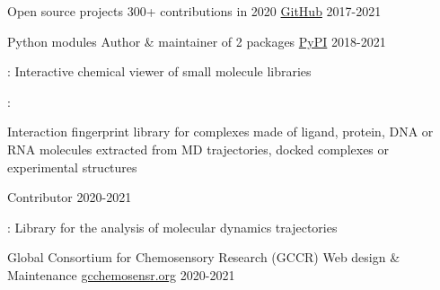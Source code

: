 
\begin{cventries}

  \cventry
    {Open source projects}
    {300+ contributions in 2020}
    {\href{https://github.com/cbouy/}{GitHub}}
    {2017-2021}
    {}

  \cventry
    {Python modules}
    {Author \& maintainer of 2 packages}
    {\href{https://pypi.org/user/cbouy/}{PyPI}}
    {2018-2021}
    {
      \begin{cvitems}
        \item{: Interactive chemical viewer of small molecule libraries}
        \item{: \parbox[t]{.7\textwidth}{Interaction fingerprint library for complexes made of ligand, protein, DNA or RNA molecules extracted from MD trajectories, docked complexes or experimental structures}}
      \end{cvitems}
    }
  
  \vspace{.3em}
  \cventry
    {}
    {Contributor}
    {}
    {2020-2021}
    {
      \begin{cvitems}
        \item{: Library for the analysis of molecular dynamics trajectories}
      \end{cvitems}
    }

  \cventry
    {Global Consortium for Chemosensory Research (GCCR)}
    {Web design \& Maintenance}
    {\href{https://gcchemosensr.org/}{gcchemosensr.org}}
    {2020-2021}
    {}

\end{cventries}
